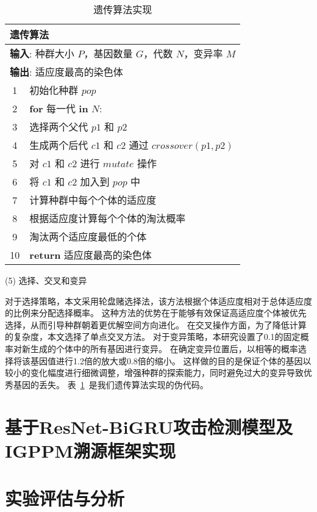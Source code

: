\begin{table}[htbp]
  \caption{遗传算法实现}
  \label{tab:genetic_algorithm}
  \centering
  \begin{tabularx}{1.0\textwidth}{cl}
  \toprule
  \multicolumn{2}{l}{\textbf{遗传算法}}\\
  \midrule
  \multicolumn{2}{l}{\textbf{输入}: 种群大小 $P$，基因数量 $G$，代数 $N$，变异率 $M$} \\
  \multicolumn{2}{l}{\textbf{输出}: 适应度最高的染色体} \\
  1& 初始化种群 $pop$ \\
  2& \textbf{for} 每一代 \textbf{in} $N$: \\
  3&\quad 选择两个父代 $p1$ 和 $p2$ \\
  4&\quad 生成两个后代 $c1$ 和 $c2$ 通过 $crossover(p1, p2)$ \\
  5&\quad 对 $c1$ 和 $c2$ 进行 $mutate$ 操作 \\
  6&\quad 将 $c1$ 和 $c2$ 加入到 $pop$ 中 \\
  7&\quad 计算种群中每个个体的适应度 \\
  8&\quad 根据适应度计算每个个体的淘汰概率 \\
  9&\quad 淘汰两个适应度最低的个体 \\
  10& \textbf{return} 适应度最高的染色体 \\
  \bottomrule
  \end{tabularx}
\end{table}

(5) 选择、交叉和变异\par
对于选择策略，本文采用轮盘赌选择法，该方法根据个体适应度相对于总体适应度的比例来分配选择概率。
这种方法的优势在于能够有效保证高适应度个体被优先选择，从而引导种群朝着更优解空间方向进化。
在交叉操作方面，为了降低计算的复杂度，本文选择了单点交叉方法。
对于变异策略，本研究设置了0.1的固定概率对新生成的个体中的所有基因进行变异。
在确定变异位置后，以相等的概率选择将该基因值进行1.2倍的放大或0.8倍的缩小。
这样做的目的是保证个体的基因以较小的变化幅度进行细微调整，增强种群的探索能力，同时避免过大的变异导致优秀基因的丢失。
表~\ref{tab:genetic_algorithm}~是我们遗传算法实现的伪代码。




\section{基于ResNet-BiGRU攻击检测模型及IGPPM溯源框架实现}

\section{实验评估与分析}
